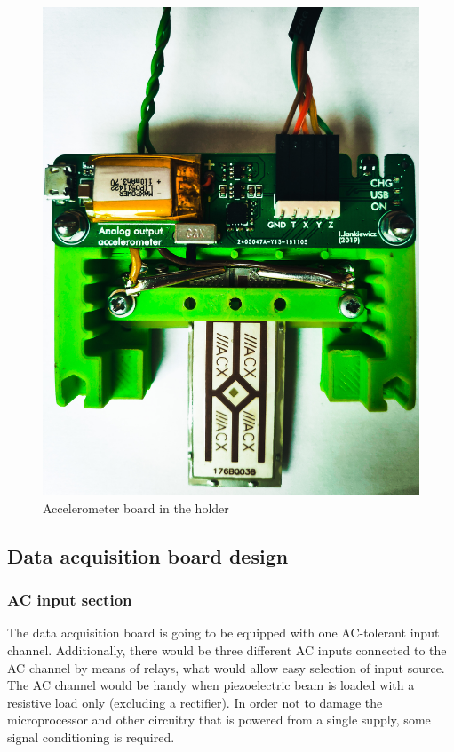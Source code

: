 \documentclass[12pt,a4paper]{article}
\begin{document}
\begin{figure}[ht!]
\includegraphics[scale=0.1]{piezoboard.jpg}
\caption{Accelerometer board in the holder}
\label{fig:piezoboard}
\end{figure}

\par

\subsection{Data acquisition board design}
\subsubsection{AC input section}
The data acquisition board is going to be equipped with one AC-tolerant input channel. Additionally, there would be three different AC inputs connected to the AC channel by means of relays, what would allow easy selection of input source. The AC channel would be handy when piezoelectric beam is loaded with a resistive load only (excluding a rectifier). In order not to damage the microprocessor and other circuitry that is powered from a single supply, some signal conditioning is required. 
\par
\end{document}
